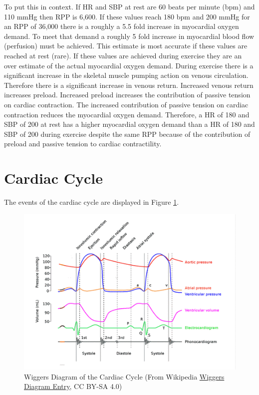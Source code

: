 To put this in context. If HR and SBP at rest are 60 beats per minute (bpm) and 110 mmHg then RPP is 6,600. If these values reach 180 bpm and 200 mmHg for an RPP of 36,000 there is a roughly a 5.5 fold increase in myocardial oxygen demand. To meet that demand a roughly 5 fold increase in myocardial blood flow (perfusion) must be achieved. This estimate is most accurate if these values are reached at rest (rare). If these values are achieved during exercise they are an over estimate of the actual myocardial oxygen demand. During exercise there is a significant increase in the skeletal muscle pumping action on venous circulation. Therefore there is a significant increase in venous return. Increased venous return increases preload. Increased preload increases the contribution of passive tension on cardiac contraction. The increased contribution of passive tension on cardiac contraction reduces the myocardial oxygen demand. 
Therefore, a HR of 180 and SBP of 200 at rest has a higher myocardial oxygen demand than a HR of 180 and SBP of 200 during exercise despite the same RPP because of the contribution of preload and passive tension to cardiac contractility.


\section{Cardiac Cycle}

The events of the cardiac cycle are displayed in Figure \ref{fig:Cardiac_Wiggers}. 
\begin{figure}[!h]
    \centering
    \includegraphics[width=1\linewidth]{./figure/Cardiac_Wiggers.png}
    \caption{Wiggers Diagram of the Cardiac Cycle \footnotesize{(From Wikipedia  \href{https://en.wikipedia.org/wiki/Wiggers_diagram}{Wiggers Diagram Entry}, CC BY-SA 4.0)}}
    \label{fig:Cardiac_Wiggers}
\end{figure}

